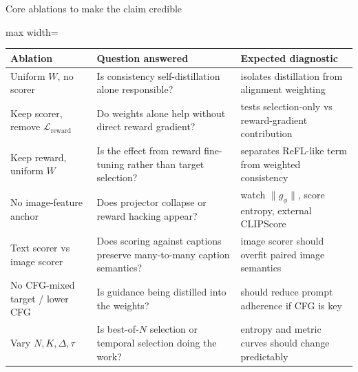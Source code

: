 \documentclass[aspectratio=169,10pt]{beamer}
\begin{document}
\begin{frame}{Core ablations to make the claim credible}
  \scriptsize
  \begin{center}
  \begin{adjustbox}{max width=\textwidth}
  \begin{tabular}{@{}p{}p{}p{}@{}}
    \toprule
    \textbf{Ablation} & \textbf{Question answered} & \textbf{Expected diagnostic} \\
    \midrule
    Uniform \(W\), no scorer & Is consistency self-distillation alone responsible? & isolates distillation from alignment weighting \\
    Keep scorer, remove \(\mathcal{L}_{\mathrm{reward}}\) & Do weights alone help without direct reward gradient? & tests selection-only vs reward-gradient contribution \\
    Keep reward, uniform \(W\) & Is the effect from reward fine-tuning rather than target selection? & separates ReFL-like term from weighted consistency \\
    No image-feature anchor & Does projector collapse or reward hacking appear? & watch \(\|g_\phi\|\), score entropy, external CLIPScore \\
    Text scorer vs image scorer & Does scoring against captions preserve many-to-many caption semantics? & image scorer should overfit paired image semantics \\
    No CFG-mixed target / lower CFG & Is guidance being distilled into the weights? & should reduce prompt adherence if CFG is key \\
    Vary \(N,K,\Delta,\tau\) & Is best-of-\(N\) selection or temporal selection doing the work? & entropy and metric curves should change predictably \\
    \bottomrule
  \end{tabular}
  \end{adjustbox}
  \end{center}
\end{frame}
\end{document}
